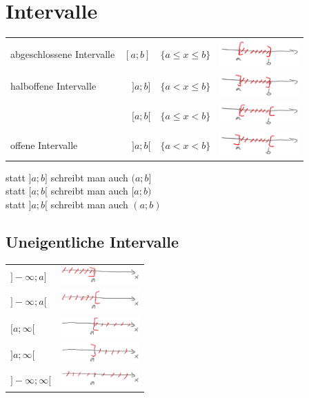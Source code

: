 \chapter{Intervalle}
\begin{longtable}{lr@{=}lc}
	abgeschlossene Intervalle & $[a;b]$ & $\{a\le x\le b\}$ & \includegraphics[width=3cm]{Bilder/83} \\
	halboffene Intervalle & $]a;b]$ & $\{a<x\le b\}$ & \includegraphics[width=3cm]{Bilder/84} \\
	& $[a;b[$ & $\{a\le x<b\}$ & \includegraphics[width=3cm]{Bilder/85} \\
	offene Intervalle & $]a;b[$ & $\{a<x<b\}$ & \includegraphics[width=3cm]{Bilder/86} \\
\end{longtable}

statt $]a;b]$ schreibt man auch $(a;b]$\\
statt $[a;b[$ schreibt man auch $[a;b)$\\
statt $]a;b[$ schreibt man auch $(a;b)$

\section{Uneigentliche Intervalle}
\begin{longtable}{lc}
	$]-\infty;a]$ & \includegraphics[width=3cm]{Bilder/87} \\
	$]-\infty;a[$ & \includegraphics[width=3cm]{Bilder/88} \\
	$[a;\infty[$ & \includegraphics[width=3cm]{Bilder/89} \\
	$]a;\infty[$ & \includegraphics[width=3cm]{Bilder/90} \\
	$]-\infty;\infty[$ & \includegraphics[width=3cm]{Bilder/91} \\
\end{longtable}

